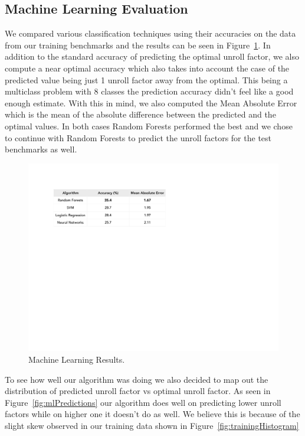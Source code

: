 \documentclass[]{sig-alternate}
\begin{document}
\subsection{Machine Learning Evaluation}
\label{subsec:MachineLearningEvaluation}

We compared various classification techniques using their accuracies on the data from our training benchmarks and the results can be seen in Figure~\ref{fig:mlResults}. In addition to the standard accuracy of predicting the optimal unroll factor, we also compute a near optimal accuracy which also takes into account the case of the predicted value being just 1 unroll factor away from the optimal. This being a multiclass problem with 8 classes the prediction accuracy didn't feel like a good enough estimate. With this in mind, we also computed the Mean Absolute Error which is the mean of the absolute difference between the predicted and the optimal values. In both cases Random Forests performed the best and we chose to continue with Random Forests to predict the unroll factors for the test benchmarks as well. 

\begin{figure}
  \center
  \includegraphics[width=0.9\linewidth]{fig/mlResults.pdf}
  \caption{Machine Learning Results.}
  \label{fig:mlResults}
\end{figure}

To see how well our algorithm was doing we also decided to map out the distribution of predicted unroll factor vs optimal unroll factor. As seen in Figure~\ref{fig:mlPredictions} our algorithm does well on predicting lower unroll factors while on higher one it doesn't do as well. We believe this is because of the slight skew observed in our training data shown in Figure~\ref{fig:trainingHistogram}
\end{document}
